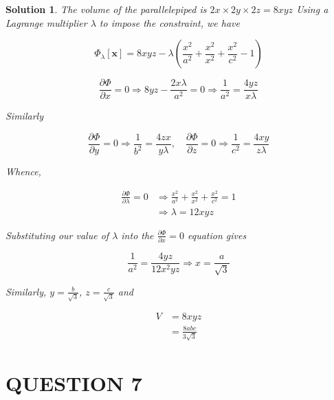 \documentclass[a4paper]{article}
\newtheorem*{soln}{Solution}
\begin{document}
\begin{soln}
The volume of the parallelepiped is $ 2x \times 2y \times 2z = 8xyz $
Using a Lagrange multiplier $ \lambda $ to impose the constraint, we have

\[ \Phi_{\lambda}[\mathbf{x}] = 8xyz - \lambda\left(  \frac{x^{2}}{a^{2}} + \frac{x^{2}}{x^{2}} + \frac{x^{2}}{c^{2}} - 1 \right)  \]
	
	
\[ 	\frac{\partial \Phi }{\partial x} = 0 \Rightarrow 8yz - \frac{2 x \lambda}{a^{2}} = 0 \Rightarrow \frac{1}{a^{2}} = \frac{4yz}{x\lambda} \]

Similarly

\[ 	\frac{\partial \Phi }{\partial y} = 0 \Rightarrow \frac{1}{b^{2}} = \frac{4zx}{y\lambda}, \quad 	\frac{\partial \Phi }{\partial z} = 0 \Rightarrow \frac{1}{c^{2}} = \frac{4xy}{z\lambda} \]

Whence, 

\begin{align*}
\frac{\partial \Phi }{\partial \lambda} = 0 & \Rightarrow \frac{x^{2}}{a^{2}} + \frac{x^{2}}{x^{2}} + \frac{x^{2}}{c^{2}} = 1 \\
& \Rightarrow \lambda = 12 xyz
\end{align*}

Substituting our value of $ \lambda $ into the $ \frac{\partial \Phi }{\partial x} = 0  $ equation gives

\[ \frac{1}{a^{2}} = \frac{4yz}{12x^{2}yz} \Rightarrow x = \frac{a}{\sqrt{3}} \]	

Similarly, $ y = \frac{b}{\sqrt{3}} $, $ z = \frac{c}{\sqrt{3}} $ and 

\begin{align*}
V & = 8xyz \\
& = \frac{8abc}{3\sqrt{3}}
\end{align*}
	
\end{soln}


\section{QUESTION 7}
\end{document}
